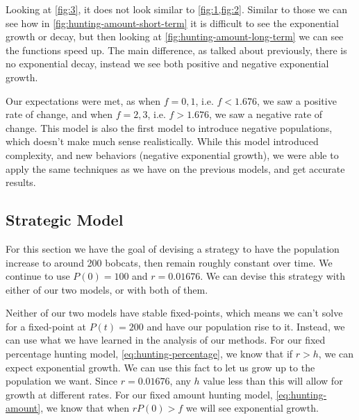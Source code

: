 \documentclass{article}
\begin{document}
Looking at \cref{fig:3}, it does not look similar to \cref{fig:1,fig:2}. Similar to those we can see how in \cref{fig:hunting-amount-short-term} it is difficult to see the exponential growth or decay, but then looking at \cref{fig:hunting-amount-long-term} we can see the functions speed up. The main difference, as talked about previously, there is no exponential decay, instead we see both positive and negative exponential growth.

Our expectations were met, as when $f=0,1$, i.e. $f < 1.676$, we saw a positive rate of change, and when $f=2,3$, i.e. $f > 1.676$, we saw a negative rate of change. This model is also the first model to introduce negative populations, which doesn't make much sense realistically. While this model introduced complexity, and new behaviors (negative exponential growth), we were able to apply the same techniques as we have on the previous models, and get accurate results.

\subsection{Strategic Model}
For this section we have the goal of devising a strategy to have the population increase to around 200 bobcats, then remain roughly constant over time. We continue to use $P(0)=100$ and $r = 0.01676$. We can devise this strategy with either of our two models, or with both of them.

Neither of our two models have stable fixed-points, which means we can't solve for a fixed-point at $P(t)=200$ and have our population rise to it. Instead, we can use what we have learned in the analysis of our methods. For our fixed percentage hunting model, \cref{eq:hunting-percentage}, we know that if $r > h$, we can expect exponential growth. We can use this fact to let us grow up to the population we want. Since $r = 0.01676$, any $h$ value less than this will allow for growth at different rates. For our fixed amount hunting model, \cref{eq:hunting-amount}, we know that when $rP(0) > f$ we will see exponential growth.
\end{document}
